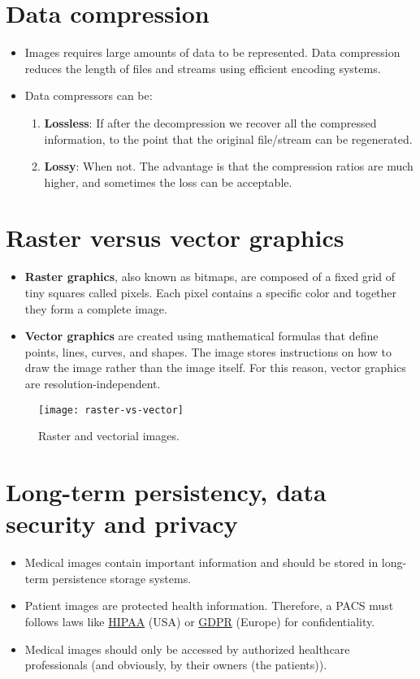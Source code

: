 \section{Data compression}
\begin{itemize}
\item Images requires large amounts of data to be represented. Data
  compression reduces the length of files and streams using efficient
  encoding systems.
\item Data compressors can be:
\begin{enumerate}
\item \textbf{Lossless}: If after the decompression we recover all the
compressed information, to the point that the original file/stream can
be regenerated.
\item \textbf{Lossy}: When not. The advantage is that the compression
ratios are much higher, and sometimes the loss can be acceptable.
\end{enumerate}
\end{itemize}

\section{Raster versus vector graphics}
\begin{itemize}
\item \textbf{Raster graphics}, also known as bitmaps, are composed of
  a fixed grid of tiny squares called pixels. Each pixel contains a
  specific color and together they form a complete image.
\item \textbf{Vector graphics} are created using mathematical formulas
  that define points, lines, curves, and shapes. The image stores
  instructions on how to draw the image rather than the image itself.
  For this reason, vector graphics are resolution-independent.
\end{itemize}
\begin{figure}[H]
  \vspace{-2ex}
  \centering
  \texttt{[image: raster-vs-vector]}
  \caption{Raster and vectorial images.}
  \label{fig:raster_vs_vector}
\end{figure}

\section{Long-term persistency, data security and privacy}
\begin{itemize}
\item Medical images contain important information and should be
  stored in long-term persistence storage systems.
\item Patient images are protected health information. Therefore, a
  \gls{PACS} must follows laws like
  \href{https://en.wikipedia.org/wiki/Health_Insurance_Portability_and_Accountability_Act}{HIPAA}
  (USA) or
  \href{https://en.wikipedia.org/wiki/General_Data_Protection_Regulation}{GDPR}
  (Europe) for confidentiality.
\item Medical images should only be accessed by authorized healthcare
  professionals (and obviously, by their owners (the patients)).
\end{itemize}
